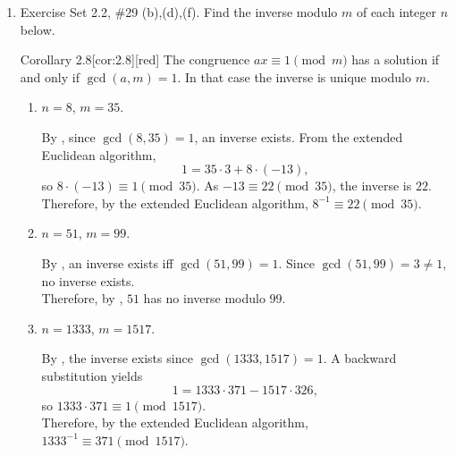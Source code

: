 \begin{enumerate}
\newpage 
\item Exercise Set 2.2, \#29 (b),(d),(f).
Find the inverse modulo $m$ of each integer $n$ below.
\begin{define}{Corollary 2.8}[cor:2.8][red]
  The congruence $ax\equiv 1\pmod{m}$ has a solution if and only if $\gcd(a,m)=1$. In that case the
  inverse is unique modulo $m$.
\end{define}
\begin{enumerate}
  \item $n=8$, $m=35$.
  \begin{subanswer}
    By , since $\gcd(8,35)=1$, an inverse exists. From the extended Euclidean algorithm,
    \[
      1=35\cdot 3+8\cdot (-13),
    \]
    so $8\cdot(-13)\equiv 1\pmod{35}$. As $-13\equiv 22\pmod{35}$, the inverse is $22$.\vspace*{10px}\\
    Therefore, by the extended Euclidean algorithm, $8^{-1}\equiv 22\pmod{35}$.
  \end{subanswer}
  \item $n=51$, $m=99$.
  \begin{subanswer}
    By , an inverse exists iff $\gcd(51,99)=1$. Since $\gcd(51,99)=3\ne 1$, no inverse exists.\vspace*{10px}\\
    Therefore, by , $51$ has no inverse modulo $99$.
  \end{subanswer}
  \item $n=1333$, $m=1517$.
  \begin{subanswer}
    By , the inverse exists since $\gcd(1333,1517)=1$. A backward substitution yields
    \[
      1=1333\cdot 371-1517\cdot 326,
    \]
    so $1333\cdot 371\equiv 1\pmod{1517}$.\vspace*{10px}\\
    Therefore, by the extended Euclidean algorithm, $1333^{-1}\equiv 371\pmod{1517}$.
  \end{subanswer}
\end{enumerate}





\end{enumerate}
